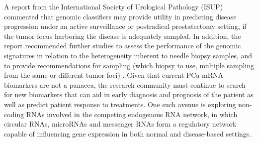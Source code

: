 A report from the International Society of Urological Pathology (ISUP) commented that genomic classifiers may provide utility in predicting disease progression under an active surveillance or postradical prostatectomy setting, if the tumor focus harboring the disease is adequately sampled. In addition, the report recommended further studies to assess the performance of the genomic signatures in relation to the heterogeneity inherent to needle biopsy samples, and to provide recommendations for sampling (which biopsy to use, multiple sampling from the same or different tumor foci) \cite{Lotan2020Jul}. Given that current PCa mRNA biomarkers are not a panacea, the research community must continue to search for new biomarkers that can aid in early diagnosis and prognosis of the patient as well as predict patient response to treatments. One such avenue is exploring non-coding RNAs involved in the competing endogenous RNA network, in which circular RNAs, microRNAs and messenger RNAs form a regulatory network capable of influencing gene expression in both normal and disease-based settings. 

